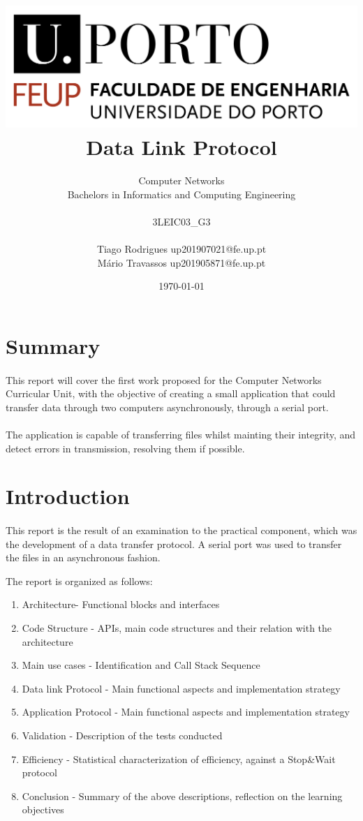\documentclass[11pt]{article}
\title{\includegraphics[scale=0.3]{logo.png} \\ \textbf{Data Link Protocol}}
\author{Computer Networks\\ Bachelors in Informatics and Computing Engineering \\ \\ 3LEIC03\_G3 \\ \\ Tiago
Rodrigues up201907021@fe.up.pt \\ Mário Travassos up201905871@fe.up.pt  }
\date{\today}
\begin{document}
\maketitle

\newpage

\section*{Summary}

\paragraph{}This report will cover the first work proposed for the Computer Networks Curricular Unit, with
the objective of creating a small application that could transfer data through two computers asynchronously,
through a serial port.

\paragraph{}The application is capable of transferring files whilst mainting their integrity, and detect
errors in transmission, resolving them if possible.

\section*{Introduction}

\paragraph{}This report is the result of an examination to the practical component, which was the
development of a data transfer protocol. A serial port was used to transfer the files in an asynchronous
fashion.

The report is organized as follows:

\begin{enumerate}
  \item{Architecture- Functional blocks and interfaces}
  \item{Code Structure - APIs, main code structures and their relation with the architecture}
  \item{Main use cases - Identification and Call Stack Sequence}
  \item{Data link Protocol - Main functional aspects and implementation strategy}
  \item{Application Protocol - Main functional aspects and implementation strategy }
  \item{Validation - Description of the tests conducted}
  \item{Efficiency - Statistical characterization of efficiency, against a Stop\&Wait protocol}
  \item{Conclusion - Summary of the above descriptions, reflection on the learning objectives}
\end{enumerate}
\end{document}
